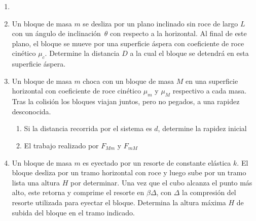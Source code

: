 \documentclass[letterpaper,11pt]{article}
\begin{document}
\vspace{-1cm}
\begin{enumerate}\setlength{\itemsep}{0.4cm}

\item[]

\item Un bloque de masa $m$ se desliza por un plano inclinado sin roce de largo $L$ con un ángulo de inclinación~$\theta$ con respecto a la horizontal. Al final de este plano, el bloque se mueve por una superficie áspera con coeficiente de roce cinético $\mu_c$. Determine la distancia $D$ a la cual el bloque se detendrá en esta superficie áspera.

\begin{figure}[htbp]
  \centering
  
\end{figure}

\item Un bloque de masa $m$ choca con un bloque de masa $M$ en una superficie horizontal con coeficiente de roce cinético $\mu_m$ y $\mu_M$ respectivo a cada masa. Tras la colisión los bloques viajan juntos, pero no pegados, a una rapidez desconocida.
\begin{enumerate}
    \item Si la distancia recorrida por el sistema es $d$, determine la rapidez inicial
    \item El trabajo realizado por $F_{Mm}$ y $F_{mM}$
\end{enumerate}

\item Un bloque de masa $m$ es eyectado por un resorte de constante elástica $k$. El bloque desliza por un tramo horizontal con roce y luego sube por un tramo lista una altura $H$ por determinar. Una vez que el cubo alcanza el punto más alto, este retorna y comprime el resorte en $\beta\Delta$, con $\Delta$ la compresión del resorte utilizada para eyectar el bloque. Determina la altura máxima $H$ de subida del bloque en el tramo indicado.

\begin{figure}[H]
    \centering
    
\end{figure}



%   

\end{enumerate}
\end{document}
